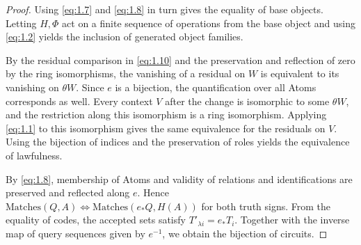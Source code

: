 \begin{proof}

Using \eqref{eq:1.7} and \eqref{eq:1.8} in turn gives the equality of base objects.
Letting $H,\Phi$ act on a finite sequence of operations from the base
object and using \eqref{eq:1.2} yields the inclusion of generated object
families.

By the residual comparison in \eqref{eq:1.10} and the preservation and
reflection of zero by the ring isomorphisms, the vanishing of a residual on $W$
is equivalent to its vanishing on $\theta W$.
Since $e$ is a bijection, the quantification over all Atoms corresponds as
well.
Every context $V$ after the change is isomorphic to some $\theta W$, and the
restriction along this isomorphism is a ring isomorphism.
Applying \eqref{eq:1.1} to this isomorphism gives the same equivalence for the
residuals on $V$.
Using the bijection of indices and the preservation of roles yields the
equivalence of lawfulness.

By \eqref{eq:1.8}, membership of Atoms and validity of relations and
identifications are preserved and reflected along $e$.
Hence $\mathrm{Matches}(Q,A)\Longleftrightarrow\mathrm{Matches}(e_*Q,H(A))$ for
both truth signs.
From the equality of codes, the accepted sets satisfy $T'_{\lambda i}=e_*T_i$.
Together with the inverse map of query sequences given by $e^{-1}$, we obtain
the bijection of circuits.

\end{proof}

